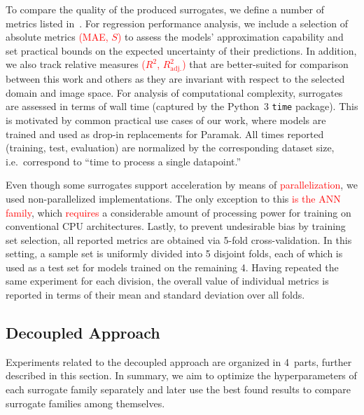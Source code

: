To compare the quality of the produced surrogates, we define a number of metrics listed
in~. For regression performance analysis, we include a
selection of absolute metrics \textcolor{red}{(MAE, $S$)} to assess the models' approximation capability
and set practical bounds on the expected uncertainty of their predictions. In addition, we also track
relative measures \textcolor{red}{($R^2$, $R^2_\text{adj.}$)} that are better-suited for comparison between this work and others as
they are invariant with respect to the selected domain and image space.
For analysis of computational complexity, surrogates are assessed in terms of wall
time (captured by the Python~3 \texttt{time} package). This is motivated by common practical use
cases of our work, where models are trained and used as drop-in replacements for
Paramak. All times reported (training, test, evaluation) are
normalized by the corresponding dataset size, i.e.~correspond to ``time to
process a single datapoint.''

Even though some surrogates support acceleration by means of \textcolor{red}{parallelization}, we
used non-parallelized implementations. The only exception to this \textcolor{red}{is the ANN family},
which \textcolor{red}{requires} a considerable amount of processing power for training on
conventional CPU architectures. Lastly, to prevent undesirable bias by training
set selection, all reported metrics are obtained via 5-fold cross-validation.
In this setting, a sample set is uniformly divided into 5 disjoint folds, each of which
is used as a test set for models trained on the remaining 4. Having repeated the
same experiment for each division, the overall value of individual metrics is
reported in terms of their mean and standard deviation over all folds.



\subsection{Decoupled Approach}\label{sec:experiment-methodology}

Experiments related to the decoupled approach are organized in 4~parts,
further described in this section. In summary, we aim to optimize the hyperparameters of
each surrogate family separately and later use the best found results to compare surrogate
families among themselves.

